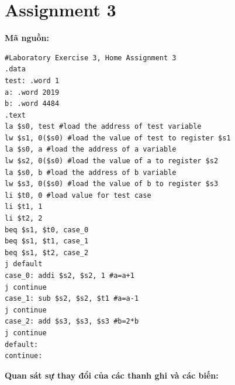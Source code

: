 \documentclass[12pt,a4paper,oneside]{article}
\begin{document}
\section{Assignment 3}
\textbf{Mã nguồn:}
\begin{center}
\begin{lstlisting}
#Laboratory Exercise 3, Home Assignment 3
.data
test: .word 1
a: .word 2019
b: .word 4484
.text
la $s0, test #load the address of test variable
lw $s1, 0($s0) #load the value of test to register $s1
la $s0, a #load the address of a variable
lw $s2, 0($s0) #load the value of a to register $s2
la $s0, b #load the address of b variable
lw $s3, 0($s0) #load the value of b to register $s3
li $t0, 0 #load value for test case
li $t1, 1
li $t2, 2
beq $s1, $t0, case_0
beq $s1, $t1, case_1
beq $s1, $t2, case_2
j default
case_0: addi $s2, $s2, 1 #a=a+1
j continue
case_1: sub $s2, $s2, $t1 #a=a-1
j continue
case_2: add $s3, $s3, $s3 #b=2*b
j continue
default:
continue:

\end{lstlisting}
\end{center}
\noindent \textbf{Quan sát sự thay đổi của các thanh ghi và các biến:}
\end{document}
